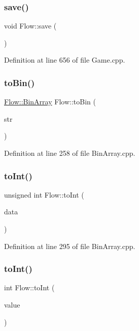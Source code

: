 \subsubsection{\texorpdfstring{save()}{save()}}
{\footnotesize\ttfamily void Flow\+::save (\begin{DoxyParamCaption}{ }\end{DoxyParamCaption})}



Definition at line 656 of file Game.\+cpp.

\hypertarget{namespace_flow_a731bdae4bdf6527208f0a8bc3b2ab609}{}\label{namespace_flow_a731bdae4bdf6527208f0a8bc3b2ab609} 
\subsubsection{\texorpdfstring{to\+Bin()}{toBin()}}
{\footnotesize\ttfamily \hyperlink{class_flow_1_1_bin_array}{Flow\+::\+Bin\+Array} Flow\+::to\+Bin (\begin{DoxyParamCaption}\item[{const std\+::string \&}]{str }\end{DoxyParamCaption})}



Definition at line 258 of file Bin\+Array.\+cpp.

\hypertarget{namespace_flow_a3fe28a3ba61421c4d80f942102b9bfdc}{}\label{namespace_flow_a3fe28a3ba61421c4d80f942102b9bfdc} 
\subsubsection{\texorpdfstring{to\+Int()}{toInt()}\hspace{0.1cm}{\footnotesize\ttfamily [1/2]}}
{\footnotesize\ttfamily unsigned int Flow\+::to\+Int (\begin{DoxyParamCaption}\item[{\hyperlink{class_flow_1_1_bin_array}{Bin\+Array} \&}]{data }\end{DoxyParamCaption})}



Definition at line 295 of file Bin\+Array.\+cpp.

\hypertarget{namespace_flow_ae3e1a43d90e5f89f9ea0e5810a499d2b}{}\label{namespace_flow_ae3e1a43d90e5f89f9ea0e5810a499d2b} 
\subsubsection{\texorpdfstring{to\+Int()}{toInt()}\hspace{0.1cm}{\footnotesize\ttfamily [2/2]}}
{\footnotesize\ttfamily int Flow\+::to\+Int (\begin{DoxyParamCaption}\item[{unsigned char}]{value }\end{DoxyParamCaption})}



